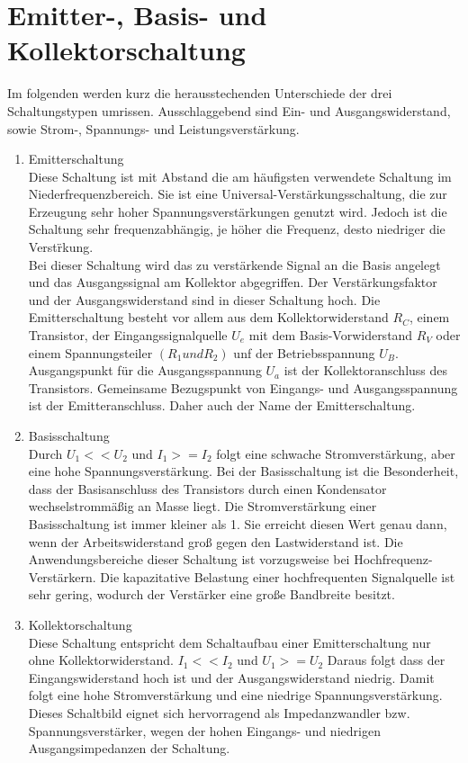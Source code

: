 \section{Emitter-, Basis- und Kollektorschaltung}
Im folgenden werden kurz die herausstechenden Unterschiede der drei Schaltungstypen
umrissen. Ausschlaggebend sind Ein- und Ausgangswiderstand, sowie Strom-, Spannungs- und
Leistungsverstärkung.
\begin{enumerate} 
\item Emitterschaltung\\
Diese Schaltung ist mit Abstand die am häufigsten verwendete Schaltung im
Niederfrequenzbereich. Sie ist eine Universal-Verst\"arkungsschaltung, die zur Erzeugung sehr hoher Spannungsverst\"arkungen genutzt wird. Jedoch ist die Schaltung sehr frequenzabh\"angig, je h\"oher die Frequenz, desto niedriger die Verst\"rkung. \\
Bei dieser Schaltung wird das zu verstärkende Signal an die Basis angelegt
und das Ausgangssignal am Kollektor abgegriffen. Der Verstärkungsfaktor und der
Ausgangswiderstand sind in dieser Schaltung hoch. Die Emitterschaltung besteht vor allem aus dem Kollektorwiderstand $R_C$, einem Transistor, der Eingangssignalquelle $U_e$ mit dem Basis-Vorwiderstand $R_V$ oder einem Spannungsteiler $(R_1 und R_2)$ unf der Betriebsspannung $U_B$. Ausgangspunkt f\"ur die Ausgangsspannung $U_a$ ist der Kollektoranschluss des Transistors. Gemeinsame Bezugspunkt von Eingangs- und Ausgangsspannung ist der Emitteranschluss. Daher auch der Name der Emitterschaltung. 
\item Basisschaltung\\
Durch $U_1<<U_2$ und $I_1>=I_2$ folgt eine schwache Stromverstärkung, aber eine hohe
Spannungsverstärkung. Bei der Basisschaltung ist die Besonderheit, dass der Basisanschluss des Transistors durch einen Kondensator wechselstromm\"a\ss{}ig an Masse liegt. Die Stromverst\"arkung einer Basisschaltung ist immer kleiner als 1. Sie erreicht diesen Wert genau dann, wenn der Arbeitswiderstand gro\ss{} gegen den Lastwiderstand ist.  
Die Anwendungsbereiche dieser Schaltung ist vorzugsweise bei Hochfrequenz-Verst\"arkern. Die kapazitative Belastung einer hochfrequenten Signalquelle ist sehr gering, wodurch der Verst\"arker eine gro\ss{}e Bandbreite besitzt. 
\item Kollektorschaltung\\
Diese Schaltung entspricht dem Schaltaufbau einer Emitterschaltung nur ohne Kollektorwiderstand. 
$I_1<<I_2$ und $U_1>=U_2$ Daraus folgt dass der Eingangswiderstand hoch ist und der
Ausgangswiderstand niedrig. Damit folgt eine hohe Stromverstärkung und eine niedrige
Spannungsverstärkung.
Dieses Schaltbild eignet sich hervorragend als Impedanzwandler bzw. Spannungsverst\"arker, wegen der hohen Eingangs- und niedrigen Ausgangsimpedanzen der Schaltung. 
\end{enumerate}

